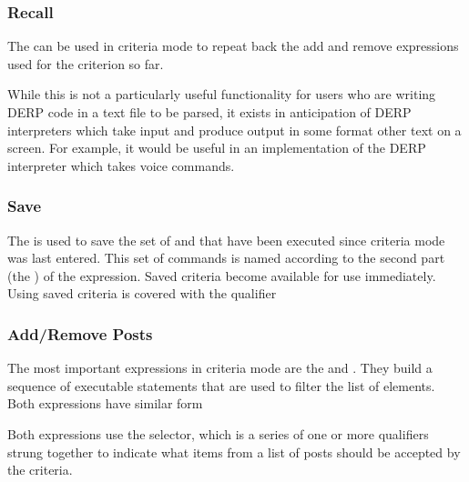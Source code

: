 \subsubsection{Recall}
The  can be used in criteria mode to repeat back the add and remove expressions used for the 
criterion so far.
\begin{center}
      
\end{center}
While this is not a particularly useful functionality for users who are writing DERP code in a text file to be 
parsed, it exists in anticipation of DERP interpreters which take input and produce output in some format other 
text on a screen. For example, it would be useful in an implementation of the DERP interpreter which takes voice 
commands.


\subsubsection{Save}
The  is used to save the set of  and  that have been executed since 
criteria mode was last entered. This set of commands is named according to the second part (the ) of the 
expression. Saved criteria become available for use immediately. Using saved criteria is covered with the  qualifier
\begin{center}
      
\end{center}

\subsubsection{Add/Remove Posts}
The most important expressions in criteria mode are the  and . They build a sequence of 
executable statements that are used to filter the list of elements. Both expressions have similar form
\begin{center}
      
      
\end{center}
Both expressions use the selector, which is a series of one or more qualifiers strung together to indicate what 
items from a list of posts should be accepted by the criteria.

